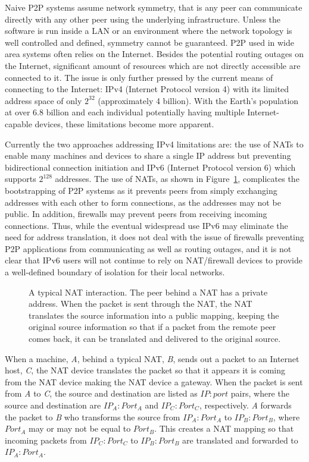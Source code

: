 Naive P2P systems assume network symmetry, that is any peer can communicate
directly with any other peer using the underlying infrastructure.  Unless the
software is run inside a LAN or an environment where the network topology is
well controlled and defined, symmetry cannot be guaranteed.  P2P used in wide
area systems often relies on the Internet.  Besides the potential routing
outages on the Internet, significant amount of resources which are not directly
accessible are connected to it.  The issue is only further pressed by the
current means of connecting to the Internet: IPv4 (Internet Protocol version 4)
with its limited address space of only $2^{32}$ (approximately 4 billion).
With the Earth's population at over 6.8 billion and each individual potentially
having multiple Internet-capable devices, these limitations become more
apparent.

Currently the two approaches addressing IPv4 limitations are:  the use of NATs
to enable many machines and devices to share a single IP address but preventing
bidirectional connection initiation and IPv6 (Internet Protocol version 6)
which supports $2^{128}$ addresses.  The use of NATs, as shown in
Figure~\ref{fig:nat}, complicates the bootstrapping of P2P systems as it
prevents peers from simply exchanging addresses with each other to form
connections, as the addresses may not be public.  In addition, firewalls may
prevent peers from receiving incoming connections.  Thus, while the eventual
widespread use IPv6 may eliminate the need for address translation, it does not
deal with the issue of firewalls preventing P2P applications from communicating
as well as routing outages, and it is not clear that IPv6 users will not
continue to rely on NAT/firewall devices to provide a well-defined boundary of
isolation for their local networks.

\begin{figure}
\centering
{}
\caption[A typical NAT interaction]{A typical NAT interaction. The peer behind
a NAT has a private address.  When the packet is sent through the NAT, the NAT
translates the source information into a public mapping, keeping the original
source information so that if a packet from the remote peer comes back, it can
be translated and delivered to the original source.}
\label{fig:nat}
\end{figure}

When a machine, \textit{A}, behind a typical NAT, \textit{B}, sends out a
packet to an Internet host, \textit{C}, the NAT device translates the packet so
that it appears it is coming from the NAT device making the NAT device a
gateway.  When the packet is sent from \textit{A} to \textit{C}, the source and
destination are listed as $IP:port$ pairs, where the source and destination are
$IP_A:Port_A$ and $IP_C:Port_C$, respectively.  \textit{A} forwards the packet
to \textit{B} who transforms the source from $IP_A:Port_A$ to $IP_B:Port_B$,
where $Port_A$ may or may not be equal to $Port_B$.  This creates a NAT mapping
so that incoming packets from $IP_C:Port_C$ to $IP_B:Port_B$ are translated and
forwarded to $IP_A:Port_A$.

